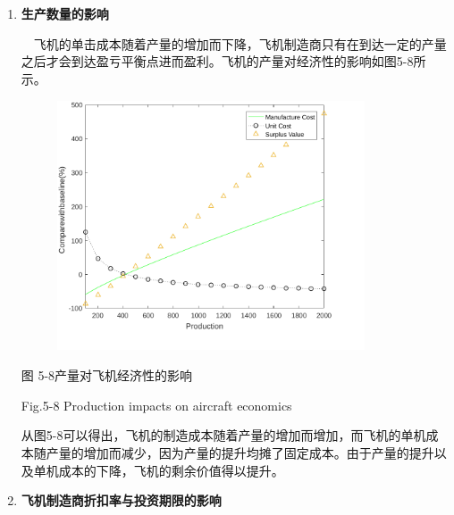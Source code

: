\documentclass[12pt]{article}
\begin{document}
\begin{enumerate}
	\item \textbf{生产数量的影响}\par

 \ \  飞机的单击成本随着产量的增加而下降，飞机制造商只有在到达一定的产量之后才会到达盈亏平衡点进而盈利。飞机的产量对经济性的影响如图5-8所示。\par




\begin{figure}[H]
	\begin{Center}
		\includegraphics[width=3.59in,height=2.92in]{./media512/image5.pdf}
	\end{Center}
\end{figure}



\par

\begin{Center}
图 5-8产量对飞机经济性的影响
\end{Center}\par

\begin{Center}
Fig.5-8 Production impacts on aircraft economics
\end{Center}\par


\vspace{\baselineskip}
从图5-8可以得出，飞机的制造成本随着产量的增加而增加，而飞机的单机成本随产量的增加而减少，因为产量的提升均摊了固定成本。由于产量的提升以及单机成本的下降，飞机的剩余价值得以提升。\par

	\item \textbf{飞机制造商折扣率与投资期限的影响}
\end{enumerate}\par
\end{document}
